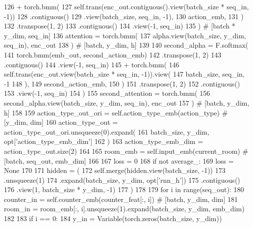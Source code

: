 \begin{DoxyCode}
126             + torch.bmm(
127                 self.trans(enc\_out.contiguous().view(batch\_size * seq\_in, -1))
128                 .contiguous()
129                 .view(batch\_size, seq\_in, -1),
130                 action\_emb,
131             )
132             .transpose(1, 2)
133             .contiguous()
134             .view(-1, seq\_in)
135         )  \textcolor{comment}{# [batch * y\_dim, seq\_in]}
136         attention = torch.bmm(
137             alpha.view(batch\_size, y\_dim, seq\_in), enc\_out
138         )  \textcolor{comment}{# [batch, y\_dim, h]}
139 
140         second\_alpha = F.softmax(
141             torch.bmm(emb\_out, second\_action\_emb)
142             .transpose(1, 2)
143             .contiguous()
144             .view(-1, seq\_in)
145             + torch.bmm(
146                 self.trans(enc\_out.view(batch\_size * seq\_in, -1)).view(
147                     batch\_size, seq\_in, -1
148                 ),
149                 second\_action\_emb,
150             )
151             .transpose(1, 2)
152             .contiguous()
153             .view(-1, seq\_in)
154         )
155         second\_attention = torch.bmm(
156             second\_alpha.view(batch\_size, y\_dim, seq\_in), enc\_out
157         )  \textcolor{comment}{# [batch, y\_dim, h]}
158 
159         action\_type\_out\_ori = self.action\_type\_emb(action\_type)  \textcolor{comment}{# [y\_dim, dim]}
160         action\_type\_out = action\_type\_out\_ori.unsqueeze(0).expand(
161             batch\_size, y\_dim, opt[\textcolor{stringliteral}{'action\_type\_emb\_dim'}]
162         )
163         action\_type\_emb\_dim = action\_type\_out.size(2)
164 
165         room\_emb = self.input\_emb(current\_room)  \textcolor{comment}{# [batch, seq\_out, emb\_dim]}
166 
167         loss = 0
168         \textcolor{keywordflow}{if} \textcolor{keywordflow}{not} average\_:
169             loss = \textcolor{keywordtype}{None}
170 
171         hidden = (
172             self.merge(hidden.view(batch\_size, -1))
173             .unsqueeze(1)
174             .expand(batch\_size, y\_dim, opt[\textcolor{stringliteral}{'rnn\_h'}])
175             .contiguous()
176             .view(1, batch\_size * y\_dim, -1)
177         )
178 
179         \textcolor{keywordflow}{for} i \textcolor{keywordflow}{in} range(seq\_out):
180             counter\_in = self.counter\_emb(counter\_feat[:, i])  \textcolor{comment}{# [batch, y\_dim, dim]}
181             room\_in = room\_emb[:, i].unsqueeze(1).expand(batch\_size, y\_dim, emb\_dim)
182 
183             \textcolor{keywordflow}{if} i == 0:
184                 y\_in = Variable(torch.zeros(batch\_size, y\_dim))

\end{DoxyCode}
